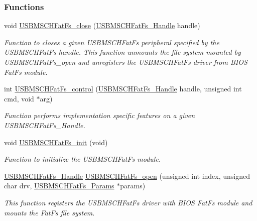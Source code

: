 \subsubsection*{Functions}
\begin{DoxyCompactItemize}
\item 
void \hyperlink{_u_s_b_m_s_c_h_fat_fs_8h_a842d3efc8c9eec33b501c3215a9c4abf}{U\+S\+B\+M\+S\+C\+H\+Fat\+Fs\+\_\+close} (\hyperlink{_u_s_b_m_s_c_h_fat_fs_8h_ae35f957205bbddee73fb052b33b1719b}{U\+S\+B\+M\+S\+C\+H\+Fat\+Fs\+\_\+\+Handle} handle)
\begin{DoxyCompactList}\small\item\em Function to closes a given U\+S\+B\+M\+S\+C\+H\+Fat\+Fs peripheral specified by the U\+S\+B\+M\+S\+C\+H\+Fat\+Fs handle. This function unmounts the file system mounted by U\+S\+B\+M\+S\+C\+H\+Fat\+Fs\+\_\+open and unregisters the U\+S\+B\+M\+S\+C\+H\+Fat\+Fs driver from B\+I\+O\+S\textquotesingle{} Fat\+Fs module. \end{DoxyCompactList}\item 
int \hyperlink{_u_s_b_m_s_c_h_fat_fs_8h_a8725aac569cefabe624b5bfda0d07422}{U\+S\+B\+M\+S\+C\+H\+Fat\+Fs\+\_\+control} (\hyperlink{_u_s_b_m_s_c_h_fat_fs_8h_ae35f957205bbddee73fb052b33b1719b}{U\+S\+B\+M\+S\+C\+H\+Fat\+Fs\+\_\+\+Handle} handle, unsigned int cmd, void $\ast$arg)
\begin{DoxyCompactList}\small\item\em Function performs implementation specific features on a given U\+S\+B\+M\+S\+C\+H\+Fat\+Fs\+\_\+\+Handle. \end{DoxyCompactList}\item 
void \hyperlink{_u_s_b_m_s_c_h_fat_fs_8h_a70cc0939d4a838e87e3bb4742dae442e}{U\+S\+B\+M\+S\+C\+H\+Fat\+Fs\+\_\+init} (void)
\begin{DoxyCompactList}\small\item\em Function to initialize the U\+S\+B\+M\+S\+C\+H\+Fat\+Fs module. \end{DoxyCompactList}\item 
\hyperlink{_u_s_b_m_s_c_h_fat_fs_8h_ae35f957205bbddee73fb052b33b1719b}{U\+S\+B\+M\+S\+C\+H\+Fat\+Fs\+\_\+\+Handle} \hyperlink{_u_s_b_m_s_c_h_fat_fs_8h_a64956f1bd732672e4cd5592a4fef4a09}{U\+S\+B\+M\+S\+C\+H\+Fat\+Fs\+\_\+open} (unsigned int index, unsigned char drv, \hyperlink{struct_u_s_b_m_s_c_h_fat_fs___params}{U\+S\+B\+M\+S\+C\+H\+Fat\+Fs\+\_\+\+Params} $\ast$params)
\begin{DoxyCompactList}\small\item\em This function registers the U\+S\+B\+M\+S\+C\+H\+Fat\+Fs driver with B\+I\+O\+S\textquotesingle{} Fat\+Fs module and mounts the Fat\+Fs file system. \end{DoxyCompactList}\item 

\end{DoxyCompactItemize}
